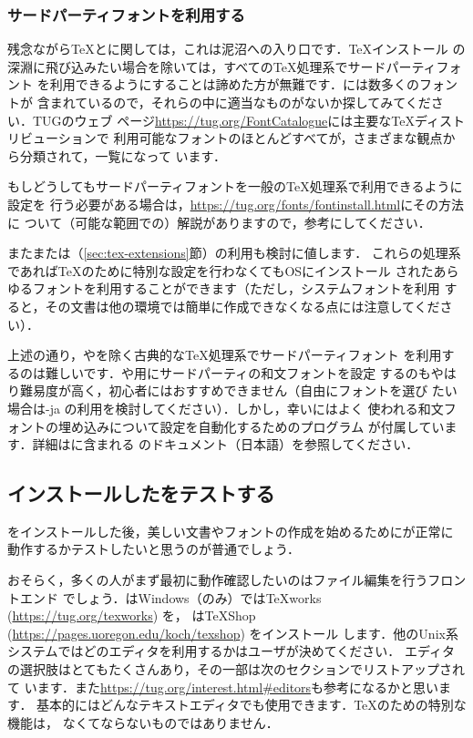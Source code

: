 \documentclass[uplatex,dvipdfmx,tombow]{jsarticle}
\begin{document}
\subsubsection{サードパーティフォントを利用する}

残念ながら\TeX と\pdfTeX に関しては，これは泥沼への入り口です．\TeX インストール
の深淵に飛び込みたい場合を除いては，すべての\TeX 処理系でサードパーティフォント
を利用できるようにすることは諦めた方が無難です．\TL には数多くのフォントが
含まれているので，それらの中に適当なものがないか探してみてください．TUGのウェブ
ページ\url{https://tug.org/FontCatalogue}には主要な\TeX ディストリビューションで
利用可能なフォントのほとんどすべてが，さまざまな観点から分類されて，一覧になって
います．

もしどうしてもサードパーティフォントを一般の\TeX 処理系で利用できるように設定を
行う必要がある場合は，\url{https://tug.org/fonts/fontinstall.html}にその方法に
ついて（可能な範囲での）解説がありますので，参考にしてください．

また\XeTeX または\LuaTeX （\ref{sec:tex-extensions}節）の利用も検討に値します．
これらの処理系であれば\TeX のために特別な設定を行わなくてもOSにインストール
されたあらゆるフォントを利用することができます（ただし，システムフォントを利用
すると，その文書は他の環境では簡単に作成できなくなる点には注意してください）．

\begin{janote}
上述の通り，\XeTeX や\LuaTeX を除く古典的な\TeX 処理系でサードパーティフォント
を利用するのは難しいです．\pTeX や\upTeX 用にサードパーティの和文フォントを設定
するのもやはり難易度が高く，初心者にはおすすめできません（自由にフォントを選び
たい場合は\LuaTeX-ja の利用を検討してください）．しかし，幸い\TL にはよく
使われる和文フォントの埋め込みについて設定を自動化するためのプログラム
が付属しています．詳細は\TL に含まれる
のドキュメント（日本語）を参照してください．
\end{janote}

\subsection{インストールした\TL をテストする}
\label{sec:test-install}

\TL をインストールした後，美しい文書やフォントの作成を始めるために\TL が正常に
動作するかテストしたいと思うのが普通でしょう．

おそらく，多くの人がまず最初に動作確認したいのはファイル編集を行うフロントエンド
でしょう．\TL はWindows（のみ）では{\TeX}works (\url{https://tug.org/texworks}) を，
\MacTeX は{\TeX}Shop (\url{https://pages.uoregon.edu/koch/texshop}) をインストール
します．他のUnix系システムではどのエディタを利用するかはユーザが決めてください．
エディタの選択肢はとてもたくさんあり，その一部は次のセクションでリストアップされて
います．また\url{https://tug.org/interest.html#editors}も参考になるかと思います．
基本的にはどんなテキストエディタでも使用できます．\TeX のための特別な機能は，
なくてならないものではありません．
\end{document}

